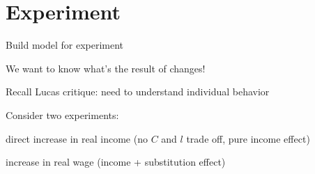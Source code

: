 \documentclass[11pt,aspectratio=169,usenames,dvipsnames]{beamer}
\let\tempone\itemize
\let\temptwo\enditemize
\renewenvironment{itemize}{\tempone\addtolength{\itemsep}{\fill}}{\temptwo}
\let\tempa\enumerate
\let\tempb\endenumerate
\renewenvironment{enumerate}{\tempa\addtolength{\itemsep}{\fill}}{\tempb}
\begin{document}
\section{Experiment}
\label{sec:Experiment}

\begin{frame}{Build model for experiment}
\label{slide:Build_model_for_experiment}
    \begin{itemize}
        \item We want to know \alert{what's the result of changes}!
        \item Recall \alert{Lucas critique}: need to understand individual behavior
        \item Consider two experiments:
        \begin{enumerate}
            \item direct increase in \alert{real income} (no $ C $ and $ l $ trade off, pure \alert{income effect})
            \item increase in \alert{real wage} (\alert{income + substitution effect})
        \end{enumerate}
    \end{itemize}
\end{frame}
\end{document}
